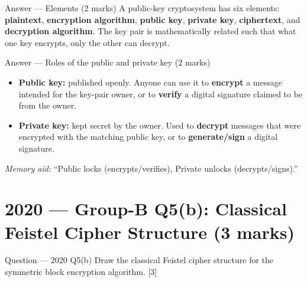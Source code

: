 \documentclass[12pt,a4paper]{article}
\begin{document}
\begin{solbox}{Answer --- Elements (2 marks)}
A public-key cryptosystem has six elements: \textbf{plaintext}, \textbf{encryption algorithm}, \textbf{public key}, \textbf{private key}, \textbf{ciphertext}, and \textbf{decryption algorithm}. The key pair is mathematically related such that what one key encrypts, only the other can decrypt.
\end{solbox}

\begin{solbox}{Answer --- Roles of the public and private key (2 marks)}
\begin{itemize}[noitemsep]
  \item \textbf{Public key:} published openly. Anyone can use it to \textbf{encrypt} a message intended for the key-pair owner, or to \textbf{verify} a digital signature claimed to be from the owner.
  \item \textbf{Private key:} kept secret by the owner. Used to \textbf{decrypt} messages that were encrypted with the matching public key, or to \textbf{generate/sign} a digital signature.
\end{itemize}
\emph{Memory aid:} ``Public locks (encrypts/verifies), Private unlocks (decrypts/signs).''
\end{solbox}

\newpage
\section{2020 --- Group-B Q5(b): Classical Feistel Cipher Structure (3 marks)}

\begin{qbox}{Question --- 2020 Q5(b)}
Draw the classical Feistel cipher structure for the symmetric block encryption algorithm. \hfill [3]
\end{qbox}
\end{document}
